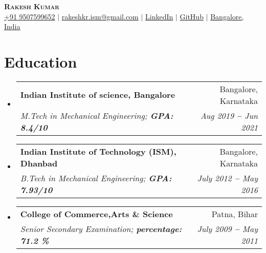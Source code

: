 \documentclass[letterpaper,11pt]{article}
\makeatletter
\newcommand{\resumeSubheading}[4]{
  \vspace{-2pt}\item
    \begin{tabular*}{0.97\textwidth}[t]{l@{\extracolsep{\fill}}r}
      \textbf{#1} & #2 \\
      \textit{\small#3} & \textit{\small #4} \\
    \end{tabular*}\vspace{-7pt}
}
\newcommand{\resumeSubHeadingListStart}{\begin{itemize}[leftmargin=0.15in, label={}]}
\newcommand{\resumeSubHeadingListEnd}{\end{itemize}}
\makeatother
\begin{document}

\begin{center}
    \textbf{\Huge \scshape Rakesh Kumar} \\ \vspace{3pt}
    \small
    \faMobile \hspace{.5pt} \href{tel:905314204536}{+91 9507599652}
    $|$
    \faAt \hspace{.5pt} \href{mailto:arasgungore09@gmail.com}{rakeshkr.ism@gmail.com}
    $|$
    \faLinkedinSquare \hspace{.5pt} \href{https://www.linkedin.com/in/arasgungore}{LinkedIn}
    $|$
    \faGithub \hspace{.5pt} \href{https://github.com/rakeshkumar18}{GitHub}
    $|$
    \faMapMarker \hspace{.5pt} \href{https://www.google.com/maps/d/u/0/viewer?mid=1k35Ia3iDr0SyJaMdv2N6c2_AUvw&hl=en&ll=13.051909273508308%2C77.94435300000002&z=12}{Bangalore, India}
\end{center}




\section{Education}
  \vspace{3pt}
  \resumeSubHeadingListStart
    
    \resumeSubheading
      {Indian Institute of science, Bangalore}
	   {Bangalore, Karnataka}
	   {M.Tech in Mechanical Engineering;   \textbf{GPA: 8.4/10}}{Aug 2019 \textbf{--} Jun 2021}

       \vspace{2pt}
    \resumeSubheading
      {Indian Institute of Technology (ISM), Dhanbad}
	   {Bangalore, Karnataka}
	   {B.Tech in Mechanical Engineering;   \textbf{GPA: 7.93/10}}{July 2012 \textbf{--} May 2016}

       \vspace{2pt}     
    \resumeSubheading
      {College of Commerce,Arts \& Science }
      {Patna, Bihar}
      {Senior Secondary Examination;   \textbf{percentage: 71.2 \%}}{July 2009 \textbf{--} May 2011}

  \resumeSubHeadingListEnd



  
\end{document}
